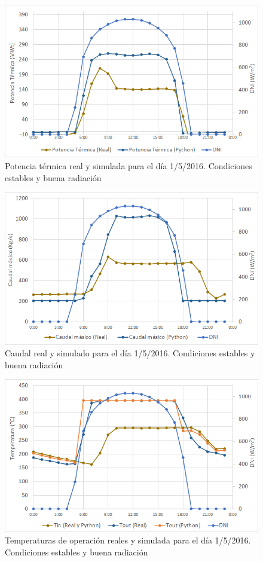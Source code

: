\begin{figure}[!h]
\includegraphics[width=0.9\linewidth]{images/potencia_aste1b_01052016.png}
\caption{Potencia térmica real y simulada para el día 1/5/2016. Condiciones estables y buena radiación} 
\label{fig:potencia_1b}
\end{figure}

\begin{figure}[!h]
\includegraphics[width=0.9\linewidth]{images/caudal_aste1b_01052016.png}
\caption{Caudal real y simulado para el día 1/5/2016. Condiciones estables y buena radiación} 
\label{fig:caudal_1b}
\end{figure}

\begin{figure}[!h]
\includegraphics[width=0.9\linewidth]{images/temperatura_aste1b_01052016.png}
\caption{Temperaturas de operación reales y simulada para el día 1/5/2016. Condiciones estables y buena radiación} 
\label{fig:temperatura_1b}
\end{figure}

